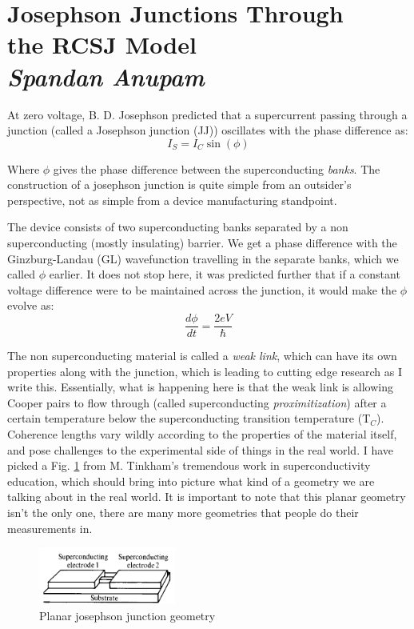 \documentclass{thesis}
\begin{document}
\chapter*{Josephson Junctions Through\\
        the RCSJ Model\\
        \normalsize \textit{Spandan Anupam}}

At zero voltage, B. D. Josephson predicted that a supercurrent passing through a junction (called a Josephson junction (JJ)) oscillates with the phase difference as:
\begin{equation}
    I_S = I_C \sin(\phi)
\end{equation}

Where $\phi$ gives the phase difference between the superconducting \textit{banks}. The construction of a josephson junction is quite simple from an outsider's perspective, not as simple from a device manufacturing standpoint.

The device consists of two superconducting banks separated by a non superconducting (mostly insulating) barrier. We get a phase difference with the Ginzburg-Landau (GL) wavefunction travelling in the separate banks, which we called $\phi$ earlier. It does not stop here, it was predicted further that if a constant voltage difference were to be maintained across the junction, it would make the $\phi$ evolve as:
\begin{equation}
    \frac{d\phi}{dt} = \frac{2eV}{\hbar}
\end{equation}

The non superconducting material is called a \textit{weak link}, which can have its own properties along with the junction, which is leading to cutting edge research as I write this. Essentially, what is happening here is that the weak link is allowing Cooper pairs to flow through (called  superconducting \textit{proximitization}) after a certain temperature below the superconducting transition temperature (T$_C$). Coherence lengths vary wildly according to the properties of the material itself, and pose challenges to the experimental side of things in the real world. I have picked a Fig. \ref{planar} from M. Tinkham's tremendous work in superconductivity education, which should bring into picture what kind of a geometry we are talking about in the real world.  It is important to note that this planar geometry isn't the only one, there are many more geometries that people do their measurements in.

\begin{figure}[H]
    \centering
    \includegraphics[width=0.4\textwidth]{images/junction_tinkham.png}
    \caption{Planar josephson junction geometry}
    \label{planar}
\end{figure}
\end{document}
